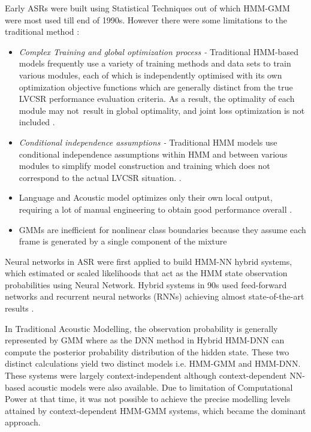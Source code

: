 
Early ASRs were built using Statistical Techniques out of which HMM-GMM were most used till end of 1990s. However there were some limitations to the traditional method \cite{backstrom_introduction_2022}:

\begin{itemize}
    \item \textit{Complex Training and global optimization process -} Traditional HMM-based models frequently use a variety of training methods and data sets to train various modules, each of which is independently optimised with its own optimization objective functions which are generally distinct from the true LVCSR performance evaluation criteria. As a result, the optimality of each module may not result in global optimality, and joint loss optimization is not included \cite{naeem_subspace_2020}.
    \item \textit{Conditional independence assumptions -} Traditional HMM models use conditional independence assumptions within HMM and between various modules to simplify model construction and training which does not correspond to the actual LVCSR situation. \cite{backstrom_introduction_2022}.
    \item Language and Acoustic model optimizes only their own local output, requiring a lot of manual engineering to obtain good performance overall \cite{naeem_subspace_2020, backstrom_introduction_2022}.
    \item GMMs are inefficient for nonlinear class boundaries because they assume each frame is generated by a single component of the mixture \cite{bell_adaptation_2021}
\end{itemize}

Neural networks in ASR were first applied to build HMM-NN hybrid systems, which estimated or scaled likelihoods that act as the HMM state observation probabilities using Neural Network. Hybrid systems in 90s used feed-forward networks and recurrent neural networks (RNNs) achieving almost state-of-the-art results \cite{morgan_continuous_1995}. 

In Traditional Acoustic Modelling, the observation probability is generally represented by GMM where as the DNN method in Hybrid HMM-DNN can compute the posterior probability distribution of the hidden state. These two distinct calculations yield two distinct models i.e. HMM-GMM and HMM-DNN. These systems were largely context-independent although context-dependent NN-based acoustic models were also available. Due to limitation of Computational Power at that time, it was not possible to achieve the precise modelling levels attained by context-dependent HMM-GMM systems, which became the dominant approach.

